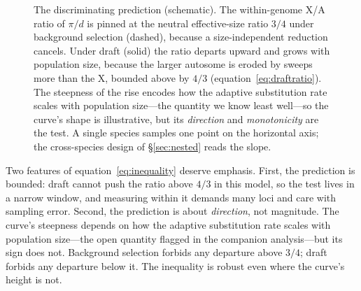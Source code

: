 \documentclass[11pt,a4paper]{article}
\newcommand{\Ne}{N_{e}}
\begin{document}
\begin{figure}[t]
\centering
{}
\caption{The discriminating prediction (schematic). The within-genome X/A ratio of $\pi/d$ is pinned at the neutral effective-size ratio $3/4$ under background selection (dashed), because a size-independent reduction cancels. Under draft (solid) the ratio departs upward and grows with population size, because the larger autosome is eroded by sweeps more than the X, bounded above by $4/3$ (equation~\ref{eq:draftratio}). The steepness of the rise encodes how the adaptive substitution rate scales with population size---the quantity we know least well---so the curve's shape is illustrative, but its \emph{direction} and \emph{monotonicity} are the test. A single species samples one point on the horizontal axis; the cross-species design of \S\ref{sec:nested} reads the slope.}
\label{fig:prediction}
\end{figure}

Two features of equation~\eqref{eq:inequality} deserve emphasis. First, the prediction is bounded: draft cannot push the ratio above $4/3$ in this model, so the test lives in a narrow window, and measuring within it demands many loci and care with sampling error. Second, the prediction is about \emph{direction}, not magnitude. The curve's steepness depends on how the adaptive substitution rate scales with population size---the open quantity flagged in the companion analysis---but its sign does not. Background selection forbids any departure above $3/4$; draft forbids any departure below it. The inequality is robust even where the curve's height is not.
\end{document}
